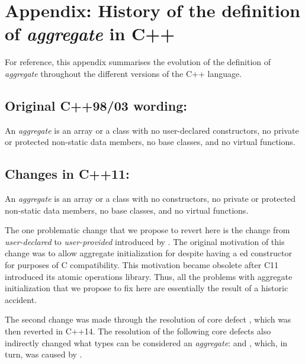 \pagebreak
\appendix
\section*{Appendix: History of the definition of \emph{aggregate} in C++}
\label{appendix}

For reference, this appendix summarises the evolution of the definition of \emph{aggregate} throughout the different versions of the C++ language.


\subsection*{Original C++98/03 wording:}

\begin{adjustwidth}{1cm}{1cm}
An \emph{aggregate} is an array or a class with no user-declared constructors, no private or protected non-static data members, no base classes, and no virtual functions.
\end{adjustwidth}

\subsection*{Changes in C++11:}

\begin{adjustwidth}{1cm}{1cm}
An \emph{aggregate} is an array or a class with no  constructors, no private or protected non-static data members, no base classes, and no virtual functions.
\end{adjustwidth}

The one problematic change that we propose to revert here is the change from \emph{user-declared} to \emph{user-provided} introduced by \cite{N2346}. The original motivation of this change was to allow aggregate initialization for  despite having a ed constructor for purposes of C compatibility. This motivation became obsolete after C11 introduced its atomic operations library. Thus, all the problems with aggregate initialization that we propose to fix here are essentially the result of a historic accident.

The second change was made through the resolution of core defect \cite{CWG886}, which was then reverted in C++14. The resolution of the following core defects also indirectly changed what types can be considered an \emph{aggregate}: \cite{CWG1355} and \cite{CWG1578}, which, in turn, was caused by \cite{CWG1301}.

